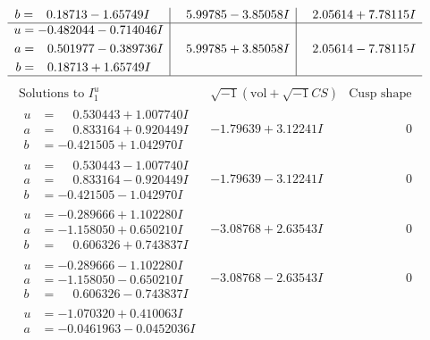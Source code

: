 \documentclass[1p]{elsarticle_modified}
\theoremstyle{definition}
\newcommand{\I}{\sqrt{-1}}
\begin{document}
$$\begin{array}{c|c|c}
\begin{aligned}
b &= \phantom{-}0.18713 - 1.65749 I\end{aligned}
 & \phantom{-}5.99785 - 3.85058 I & \phantom{-}2.05614 + 7.78115 I \\ \hline\begin{aligned}
u &= -0.482044 - 0.714046 I \\
a &= \phantom{-}0.501977 - 0.389736 I \\
b &= \phantom{-}0.18713 + 1.65749 I\end{aligned}
 & \phantom{-}5.99785 + 3.85058 I & \phantom{-}2.05614 - 7.78115 I\\
 \hline 
 \end{array}$$\newpage$$\begin{array}{c|c|c}  
\text{Solutions to }I^u_{1}& \I (\text{vol} + \sqrt{-1}CS) & \text{Cusp shape}\\
 \hline 
\begin{aligned}
u &= \phantom{-}0.530443 + 1.007740 I \\
a &= \phantom{-}0.833164 + 0.920449 I \\
b &= -0.421505 + 1.042970 I\end{aligned}
 & -1.79639 + 3.12241 I & \phantom{-0.000000 } 0 \\ \hline\begin{aligned}
u &= \phantom{-}0.530443 - 1.007740 I \\
a &= \phantom{-}0.833164 - 0.920449 I \\
b &= -0.421505 - 1.042970 I\end{aligned}
 & -1.79639 - 3.12241 I & \phantom{-0.000000 } 0 \\ \hline\begin{aligned}
u &= -0.289666 + 1.102280 I \\
a &= -1.158050 + 0.650210 I \\
b &= \phantom{-}0.606326 + 0.743837 I\end{aligned}
 & -3.08768 + 2.63543 I & \phantom{-0.000000 } 0 \\ \hline\begin{aligned}
u &= -0.289666 - 1.102280 I \\
a &= -1.158050 - 0.650210 I \\
b &= \phantom{-}0.606326 - 0.743837 I\end{aligned}
 & -3.08768 - 2.63543 I & \phantom{-0.000000 } 0 \\ \hline\begin{aligned}
u &= -1.070320 + 0.410063 I \\
a &= -0.0461963 - 0.0452036 I \\

\end{aligned}
\end{array}$$
\end{document}
